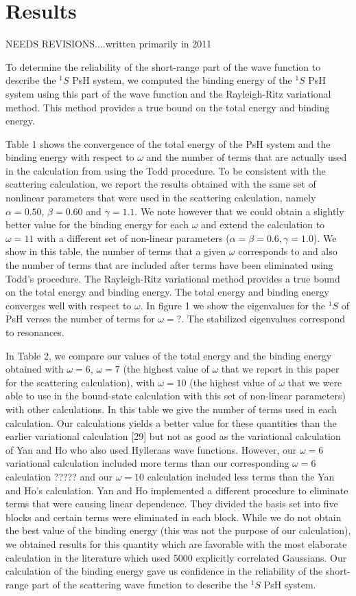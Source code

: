 \documentclass[preprint,showpacs,preprintnumbers,amsmath,amssymb]{revtex4}
\begin{document}
\section{Results}
NEEDS REVISIONS....written primarily in 2011

To determine the reliability of the short-range part of 
the wave function to describe the
$^1S$ PsH system, we computed the binding energy of
the $^1S$ PsH system using this part of the wave function
and the Rayleigh-Ritz variational method.
This method provides a true bound on the total energy
and binding energy.

Table 1 shows the convergence of the total
energy of the PsH system and the binding energy
with respect to $\omega$ and the number of terms
that are actually used in the calculation
from using the Todd procedure. 
To be consistent with the scattering calculation,
we report the results obtained with
the same set of nonlinear parameters
that were used in the scattering calculation,
namely $\alpha =0.50$, $\beta=0.60$ and $\gamma=1.1$.
We note however that we could obtain a slightly better
value for the binding energy for each $\omega$ and extend
the calculation to $\omega =11$ with a
different set of non-linear parameters
($\alpha = \beta =0.6, \gamma =1.0$).
We show in this table, the number of terms that
a given $\omega$ corresponds to
and also the number of terms that are
included after terms have been eliminated using Todd's procedure.
The Rayleigh-Ritz variational method provides
a true bound on the total energy and binding
energy.
The total energy and binding energy
converges well with respect to $\omega$.
In figure 1 we show the eigenvalues for the $^1S$ of PsH
verses the number of terms for $\omega =?$.
The stabilized eigenvalues correspond to
resonances.


In Table 2, we compare our values of the total
energy and
the binding energy obtained with $\omega=6$, $\omega=7$ (the highest
value of $\omega$ that we report in this paper for
the scattering calculation), with $\omega=10$ (the highest
value of $\omega$ that we were able to use in the
bound-state calculation with this set of
non-linear parameters) with other calculations.
In this table we give the number of terms used
in each calculation.
Our calculations yields a better value for these
quantities than the earlier variational calculation [29]
but not as good as the variational calculation of
Yan and Ho who also used Hylleraas wave functions.
However, our $\omega=6$ variational calculation included
more terms than our corresponding $\omega=6$ calculation ?????
and our $\omega=10$ calculation included less terms than
the Yan and Ho's calculation.
Yan and Ho implemented a different procedure
to  eliminate terms that were causing linear dependence.
They divided the basis set into
five blocks and certain terms were eliminated in each block.
While we do not obtain the best value of the binding energy
(this was not the purpose of our calculation),
we obtained results for this quantity which are favorable with
the most elaborate calculation in the literature which
used 5000 explicitly correlated Gaussians.
Our calculation of the binding energy gave us confidence
in the reliability of the short-range part of the
scattering wave function to describe
the $^1S$ PsH system.
 
\end{document}

